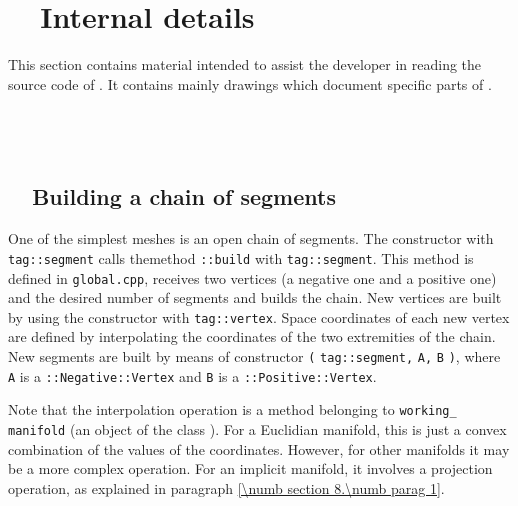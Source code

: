 

\chapter{~~Internal details}\label{\numb section 12}

This section contains material intended to assist the developer in reading the source code
of \maniFEM.
It contains mainly drawings which document specific parts of \maniFEM.


\section{~~}\label{\numb section 12.\numb parag 1}


\section{~~Building a chain of segments}\label{\numb section 12.\numb parag 2}

One of the simplest meshes is an open chain of segments.
The {\small\tt {}} constructor with {\small\tt\textcolor{tag}{tag}::segment}
calls themethod {\small\tt{}::build} with {\small\tt \textcolor{tag}{tag}::segment}.
This method is defined in
{\small\tt global.cpp}, receives two vertices (a negative one and a positive one)
and the desired number of segments and builds the chain.
New vertices are built by using the {\small\tt {}} constructor with
{\small\tt\textcolor{tag}{tag}::vertex}.
Space coordinates of each new vertex are defined by interpolating the coordinates of the
two extremities of the chain.
New segments are built by means of constructor {\small\tt {}} {\small\tt(}
{\small\tt\textcolor{tag}{tag}::segment,} {\small\tt A,} {\small\tt B} {\small\tt )},
where {\small\tt A} is a {\small\tt {}::Negative::Vertex} and {\small\tt B} is a
{\small\tt {}::Positive::Vertex}.

Note that the interpolation operation is a method belonging to {\small\tt working\_\,manifold}
(an object of the class {\small\tt{}}).
For a Euclidian manifold, this is just a convex combination of the values of the coordinates.
However, for other manifolds it may be a more complex operation.
For an implicit manifold, it involves a projection operation, as explained in paragraph
\ref{\numb section 8.\numb parag 1}.

